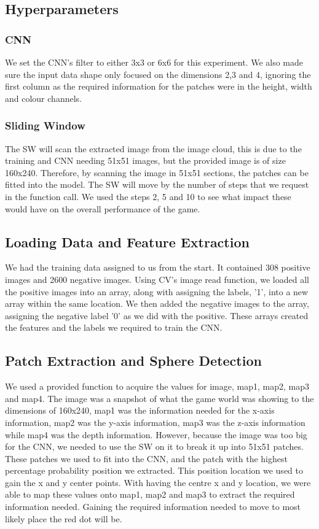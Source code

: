 \documentclass[a4paper,10pt]{article}
\begin{document}
\subsection{Hyperparameters}

\subsubsection{CNN}
We set the CNN's filter to either 3x3 or 6x6 for this experiment. We also made sure the input data shape only focused on the dimensions 2,3 and 4, ignoring the first column as the required information for the patches were in the height, width and colour channels.

\subsubsection{Sliding Window}
The SW will scan the extracted image from the image cloud, this is due to the training and CNN needing 51x51 images, but the provided image is of size 160x240. Therefore, by scanning the image in 51x51 sections, the patches can be fitted into the model. The SW will move by the number of steps that we request in the function call. We used the steps 2, 5 and 10 to see what impact these would have on the overall performance of the game. 

\subsection{Loading Data and Feature Extraction}
We had the training data assigned to us from the start. It contained 308 positive images and 2600 negative images. Using CV's image read function, we loaded all the positive images into an array, along with assigning the labels, '1', into a new array within the same location. We then added the negative images to the array, assigning the negative label '0' as we did with the positive. These arrays created the features and the labels we required to train the CNN.

\subsection{Patch Extraction and Sphere Detection}
We used a provided function to acquire the values for image, map1, map2, map3 and map4. The image was a snapshot of what the game world was showing to the dimensions of 160x240, map1 was the information needed for the x-axis information, map2 was the y-axis information, map3 was the z-axis information while map4 was the depth information. However, because the image was too big for the CNN, we needed to use the SW on it to break it up into 51x51 patches. These patches we used to fit into the CNN, and the patch with the highest percentage probability position we extracted. This position location we used to gain the x and y center points. With having the centre x and y location, we were able to map these values onto map1, map2 and map3 to extract the required information needed. Gaining the required information needed to move to most likely place the red dot will be.
\end{document}
